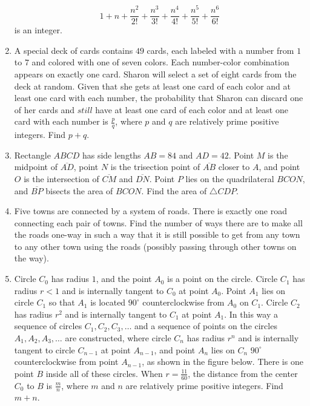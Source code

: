 \documentclass{article}
\begin{document}
\begin{enumerate}[label=\arabic*., itemsep=0.5em]
\begin{equation*}
1+n+\frac{n^2}{2!}+\frac{n^3}{3!}+\frac{n^4}{4!}+\frac{n^5}{5!}+\frac{n^6}{6!}
\end{equation*}
 is an integer.\par \vspace{0.5em}\item A special deck of cards contains \(49\) cards, each labeled with a number from \(1\) to \(7\) and colored with one of seven colors. Each number-color combination appears on exactly one card. Sharon will select a set of eight cards from the deck at random. Given that she gets at least one card of each color and at least one card with each number, the probability that Sharon can discard one of her cards and \(\textit{still}\) have at least one card of each color and at least one card with each number is \(\frac{p}{q}\), where \(p\) and \(q\) are relatively prime positive integers. Find \(p+q\).\par \vspace{0.5em}\item Rectangle \(ABCD\) has side lengths \(AB=84\) and \(AD=42\). Point \(M\) is the midpoint of \(\overline{AD}\), point \(N\) is the trisection point of \(\overline{AB}\) closer to \(A\), and point \(O\) is the intersection of \(\overline{CM}\) and \(\overline{DN}\). Point \(P\) lies on the quadrilateral \(BCON\), and \(\overline{BP}\) bisects the area of \(BCON\). Find the area of \(\triangle CDP\).\par \vspace{0.5em}\item Five towns are connected by a system of roads. There is exactly one road connecting each pair of towns. Find the number of ways there are to make all the roads one-way in such a way that it is still possible to get from any town to any other town using the roads (possibly passing through other towns on the way).\par \vspace{0.5em}\item Circle \(C_0\) has radius \(1\), and the point \(A_0\) is a point on the circle. Circle \(C_1\) has radius \(r<1\) and is internally tangent to \(C_0\) at point \(A_0\). Point \(A_1\) lies on circle \(C_1\) so that \(A_1\) is located \(90^{\circ}\) counterclockwise from \(A_0\) on \(C_1\). Circle \(C_2\) has radius \(r^2\) and is internally tangent to \(C_1\) at point \(A_1\). In this way a sequence of circles \(C_1,C_2,C_3,\ldots\) and a sequence of points on the circles \(A_1,A_2,A_3,\ldots\) are constructed, where circle \(C_n\) has radius \(r^n\) and is internally tangent to circle \(C_{n-1}\) at point \(A_{n-1}\), and point \(A_n\) lies on \(C_n\) \(90^{\circ}\) counterclockwise from point \(A_{n-1}\), as shown in the figure below. There is one point \(B\) inside all of these circles. When \(r = \frac{11}{60}\), the distance from the center \(C_0\) to \(B\) is \(\frac{m}{n}\), where \(m\) and \(n\) are relatively prime positive integers. Find \(m+n\).



\end{enumerate}
\end{document}
